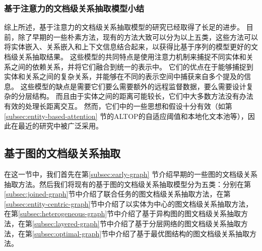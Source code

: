 \documentclass[bachelor]{thesis-uestc}
\begin{document}
\subsubsection{基于注意力的文档级关系抽取模型小结}

综上所述，基于注意力的文档级关系抽取模型的研究已经取得了长足的进步。
目前，除了早期的一些朴素方法，现有的方法大致可以分为以上五类，这些方法可以将实体嵌入、关系嵌入和上下文信息结合起来，以获得比基于序列的模型更好的文档级关系抽取结果。
这些模型的共同特点是使用注意力机制来捕捉不同实体和关系之间的依赖关系，并将它们融合到统一的表示中。
它们的优点在于能够捕捉到实体和关系之间的复杂关系，并能够在不同的表示空间中捕获来自多个提及的信息。
这些模型的缺点是需要它们要么需要额外的远程监督数据，要么需要设计复杂的分层结构。
而且由于实体之间的距离可能较长，它们中大多数方法没有办法有效的处理长距离交互。
然而，它们中的一些思想和假设十分有效（如第\ref{subsec:entity-based-attention} 节的ALTOP的自适应阈值和本地化文本池等），因此在最近的研究中被广泛采用。
\subsection{基于图的文档级关系抽取}
在这一节中，我们首先在第\ref{subsec:early-graph} 节介绍早期的一些图的文档级关系抽取方法。然后我们将现有的基于图的文档级关系抽取模型分为五类：分别在第\ref{subsec:joined-graph}节中介绍了联合任务的图文档级关系抽取方法，在第\ref{subsec:entity-centric-graph}节中介绍了以实体为中心的图文档级关系抽取方法，在第\ref{subsec:heterogeneous-graph}节中介绍了基于异构图的图文档级关系抽取方法，在第\ref{subsec:layered-graph}节中介绍了基于分层网络的图文档级关系抽取方法，在第\ref{subsec:optimal-graph}节中介绍了基于最优图结构的图文档级关系抽取方法。
\end{document}
